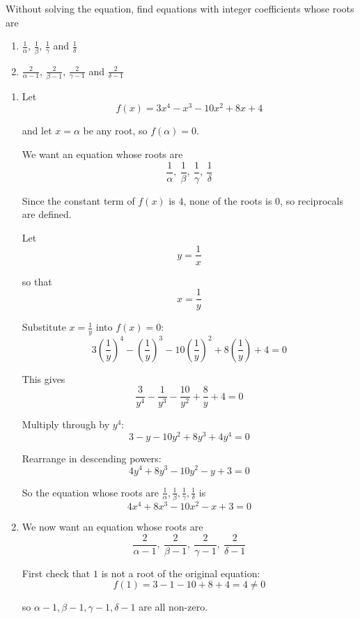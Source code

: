 \documentclass[leqno]{article}
\begin{document}
\begin{enumerate}[
  label=\textbf{\arabic*.},
  leftmargin=*,
  topsep=0pt,
  partopsep=0pt,
  parsep=0pt
]
Without solving the equation, find equations with integer coefficients whose roots are \\
\begin{enumerate}[label=\textbf{(\alph*)}]
  \item $\frac{1}{\alpha}$, $\frac{1}{\beta}$, $\frac{1}{\gamma}$ and $\frac{1}{\delta}$  \\
  \item $\frac{2}{\alpha - 1}$, $\frac{2}{\beta - 1}$, $\frac{2}{\gamma - 1}$ and $\frac{2}{\delta - 1}$  \\
\end{enumerate}

\vspace*{10pt}

\begin{djsSolution}
\begin{enumerate}[label=\textbf{(\alph*)}]
  \item Let
\[
f(x)=3x^4-x^3-10x^2+8x+4
\]

and let \(x=\alpha\) be any root, so \(f(\alpha)=0\).

We want an equation whose roots are
\[
\frac1\alpha,\ \frac1\beta,\ \frac1\gamma,\ \frac1\delta
\]

Since the constant term of \(f(x)\) is \(4\), none of the roots is \(0\), so reciprocals are defined.

Let
\[
y=\frac1x
\]

so that
\[
x=\frac1y
\]

Substitute \(x=\frac1y\) into \(f(x)=0\):
\[
3\left(\frac1y\right)^4-\left(\frac1y\right)^3-10\left(\frac1y\right)^2+8\left(\frac1y\right)+4=0
\]

This gives
\[
\frac{3}{y^4}-\frac{1}{y^3}-\frac{10}{y^2}+\frac{8}{y}+4=0
\]

Multiply through by \(y^4\):
\[
3-y-10y^2+8y^3+4y^4=0
\]

Rearrange in descending powers:
\[
4y^4+8y^3-10y^2-y+3=0
\]

So the equation whose roots are
\(\frac1\alpha,\frac1\beta,\frac1\gamma,\frac1\delta\) is
\[
4x^4+8x^3-10x^2-x+3=0
\]

  \item We now want an equation whose roots are
\[
\frac{2}{\alpha-1},\ \frac{2}{\beta-1},\ \frac{2}{\gamma-1},\ \frac{2}{\delta-1}
\]

First check that \(1\) is not a root of the original equation:
\[
f(1)=3-1-10+8+4=4\neq 0
\]

so \(\alpha-1,\beta-1,\gamma-1,\delta-1\) are all non-zero.


\end{enumerate}
\end{djsSolution}
\end{enumerate}
\end{document}
